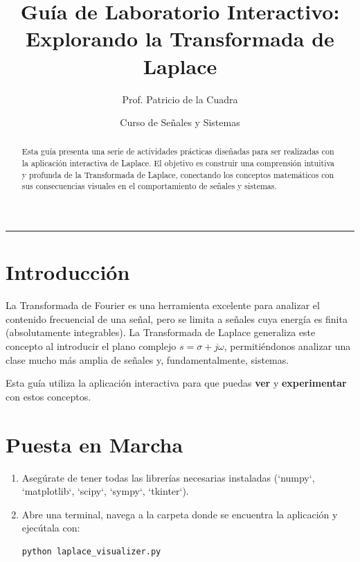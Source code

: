 \documentclass[12pt, a4paper]{article}
\begin{document}
\title{\textbf{Guía de Laboratorio Interactivo:}\\ \Large Explorando la Transformada de Laplace}
\author{Prof. Patricio de la Cuadra}
\date{Curso de Señales y Sistemas}
\maketitle

\begin{abstract}
\noindent Esta guía presenta una serie de actividades prácticas diseñadas para ser realizadas con la aplicación interactiva de Laplace. El objetivo es construir una comprensión intuitiva y profunda de la Transformada de Laplace, conectando los conceptos matemáticos con sus consecuencias visuales en el comportamiento de señales y sistemas.
\end{abstract}

\hrule
\vspace{1cm}

\section*{Introducción}
La Transformada de Fourier es una herramienta excelente para analizar el contenido frecuencial de una señal, pero se limita a señales cuya energía es finita (absolutamente integrables). La Transformada de Laplace generaliza este concepto al introducir el plano complejo $s = \sigma + j\omega$, permitiéndonos analizar una clase mucho más amplia de señales y, fundamentalmente, sistemas.

Esta guía utiliza la aplicación interactiva para que puedas \textbf{ver} y \textbf{experimentar} con estos conceptos.

\section*{Puesta en Marcha}
\begin{enumerate}
    \item Asegúrate de tener todas las librerías necesarias instaladas (`numpy`, `matplotlib`, `scipy`, `sympy`, `tkinter`).
    \item Abre una terminal, navega a la carpeta donde se encuentra la aplicación y ejecútala con:
    \begin{verbatim}
python laplace_visualizer.py
    \end{verbatim}
\end{enumerate}

\newpage
\end{document}
